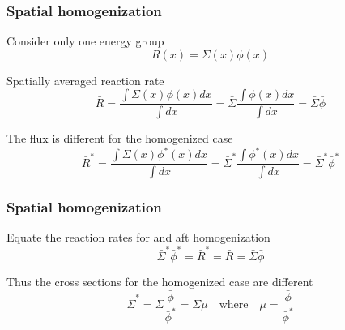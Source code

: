 \documentclass[fleqn]{beamer}
\begin{document}
    \begin{frame}
        \frametitle{Spatial homogenization}
        \centering
        \begin{block}{Consider only one energy group}
            \begin{equation*}
                R(x) = \Sigma(x)\phi(x)
            \end{equation*}
        \end{block}
        \begin{block}{Spatially averaged reaction rate}
            \begin{equation*}
                \bar{R} = \frac{\int\Sigma(x)\phi(x)dx}{\int dx}=\bar{\Sigma}\frac{\int\phi(x)dx}{\int dx}=\bar{\Sigma}\bar{\phi}
            \end{equation*}
        \end{block}
        \begin{block}{The flux is different for the homogenized case}
            \begin{equation*}
                \bar{R}^* = \frac{\int\Sigma(x)\phi^*(x)dx}{\int dx}=\bar{\Sigma}^*\frac{\int\phi^*(x)dx}{\int dx}=\bar{\Sigma}^*\bar{\phi}^*
            \end{equation*}
        \end{block}
    \end{frame}

    \begin{frame}
        \frametitle{Spatial homogenization}
        \centering
        \begin{block}{Equate the reaction rates for and aft homogenization}
            \begin{equation*}
                \bar{\Sigma}^*\bar{\phi}^* = \bar{R}^* = \bar{R} = \bar{\Sigma}\bar{\phi}
            \end{equation*}
        \end{block}
        \begin{block}{Thus the cross sections for the homogenized case are different}
            \begin{equation*}
                \bar{\Sigma}^* = \bar{\Sigma}\frac{\bar{\phi}}{\bar{\phi}^*} = \bar{\Sigma}\mu
                \quad\text{where}\quad
                \mu=\frac{\bar{\phi}}{\bar{\phi}^*}
            \end{equation*}
        \end{block}
    \end{frame}
\end{document}

